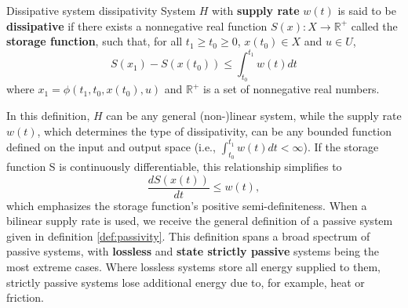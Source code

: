 \begin{definition}[list text=Dissipative system]{Dissipative system \cite{baoProcessControlPassive2007}}{dissipativity}
  System $H$ with \textbf{supply rate} $w \left( t \right)$ is said to be \textbf{dissipative} if there exists a nonnegative real function $S \left( x \right): X \rightarrow\mathbb{R}^+$ called the \textbf{storage function}, such that, for all $t_1 \geq t_0 \geq 0$, $x\left(t_0\right) \in X$ and $u \in U$,
  \begin{equation}
    S \left( x_1 \right)- S \left( x\left(t_0\right) \right) \le \int_{ t_0 }^{ t_1 } w \left( t \right) dt
  \end{equation}
  where $x_1 = \phi \left(t_1, t_0, x\left(t_0\right), u \right)$ and $\mathbb{R}^+$ is a set of nonnegative real numbers.
\end{definition}

In this definition, $H$ can be any general (non-)linear system, while the supply rate $w \left( t \right)$, which determines the type of dissipativity, can be any bounded function defined on the input and output space (i.e., $\int_{ t_0 }^{ t_1 } w \left( t \right)dt<\infty$). If the storage function S is continuously differentiable, this relationship simplifies to
\begin{equation}
  \frac{ dS \left( x \left( t \right)\right)}{ dt }\le w \left( t \right),
\end{equation}
which emphasizes the storage function's positive semi-definiteness. When a bilinear supply rate is used, we receive the general definition of a passive system given in definition \ref{def:passivity}. This definition spans a broad spectrum of passive systems, with \textbf{lossless} and \textbf{state strictly passive} systems being the most extreme cases. Where lossless systems store all energy supplied to them, strictly passive systems lose additional energy due to, for example, heat or friction.

